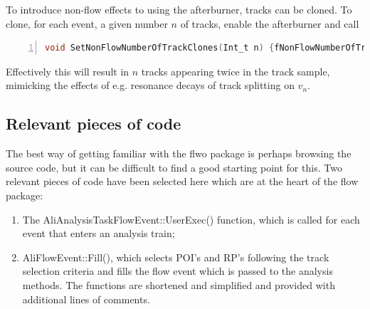 \documentclass[a4paper]{book}
\numberwithin{equation}{subsection}
\begin{document}
To introduce non-flow effects to using the afterburner, tracks can be cloned. To clone, for each event, a given number $n$ of tracks, enable the afterburner and call
\begin{lstlisting}[language=C, numbers=left]
  void SetNonFlowNumberOfTrackClones(Int_t n) {fNonFlowNumberOfTrackClones=n;}\end{lstlisting}
Effectively this will result in $n$ tracks appearing twice in the track sample, mimicking the effects of e.g. resonance decays of track splitting on $v_n$.

\subsection{Relevant pieces of code}
The best way of getting familiar with the flwo package is perhaps browsing the source code, but it can be difficult to find a good starting point for this. Two relevant pieces of code have been selected here which are at the heart of the flow package: 
\begin{enumerate}
\item The AliAnalysisTaskFlowEvent::UserExec() function, which is called for each event that enters an analysis train;
\item AliFlowEvent::Fill(), which selects POI's and RP's following the track selection criteria and fills the flow event which is passed to the analysis methods. The functions are shortened and simplified and provided with additional lines of comments.
\end{enumerate}
\end{document}
